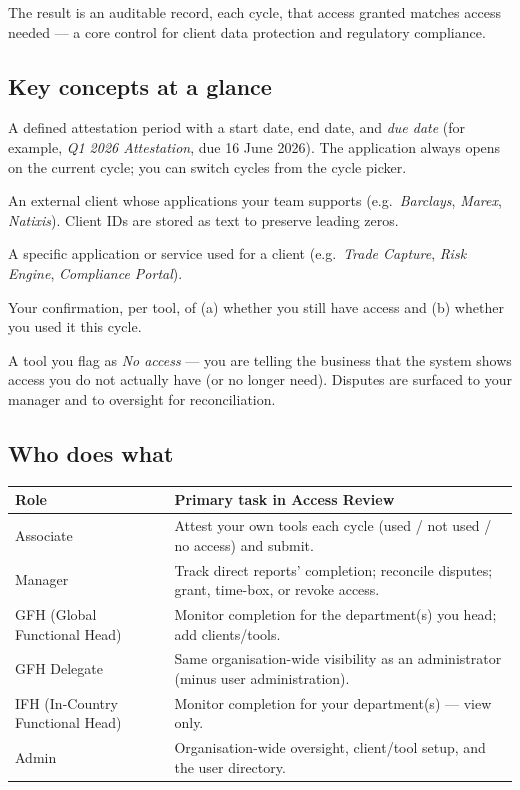 \documentclass[11pt]{article}
\begin{document}
The result is an auditable record, each cycle, that access granted matches access needed --- a core
control for client data protection and regulatory compliance.

\subsection{Key concepts at a glance}
\begin{description}[leftmargin=1.5cm,style=nextline]
  \item[Cycle] A defined attestation period with a start date, end date, and \emph{due date}
        (for example, \emph{Q1 2026 Attestation}, due 16 June 2026). The application always opens on
        the current cycle; you can switch cycles from the cycle picker.
  \item[Client] An external client whose applications your team supports (e.g.\ \emph{Barclays},
        \emph{Marex}, \emph{Natixis}). Client IDs are stored as text to preserve leading zeros.
  \item[Tool] A specific application or service used for a client (e.g.\ \emph{Trade Capture},
        \emph{Risk Engine}, \emph{Compliance Portal}).
  \item[Attestation] Your confirmation, per tool, of (a) whether you still have access and
        (b) whether you used it this cycle.
  \item[Dispute] A tool you flag as \emph{No access} --- you are telling the business that the system
        shows access you do not actually have (or no longer need). Disputes are surfaced to your
        manager and to oversight for reconciliation.
\end{description}

\subsection{Who does what}
\begin{table}[H]\centering\small
\renewcommand{\arraystretch}{1.3}
\begin{tabularx}{\linewidth}{@{}l>{\raggedright\arraybackslash}X@{}}
\toprule
\textbf{Role} & \textbf{Primary task in Access Review}\\
\midrule
Associate & Attest your own tools each cycle (used / not used / no access) and submit.\\
Manager & Track direct reports' completion; reconcile disputes; grant, time-box, or revoke access.\\
GFH (Global Functional Head) & Monitor completion for the department(s) you head; add clients/tools.\\
GFH Delegate & Same organisation-wide visibility as an administrator (minus user administration).\\
IFH (In-Country Functional Head) & Monitor completion for your department(s) --- view only.\\
Admin & Organisation-wide oversight, client/tool setup, and the user directory.\\
\bottomrule
\end{tabularx}
\end{table}
\end{document}
